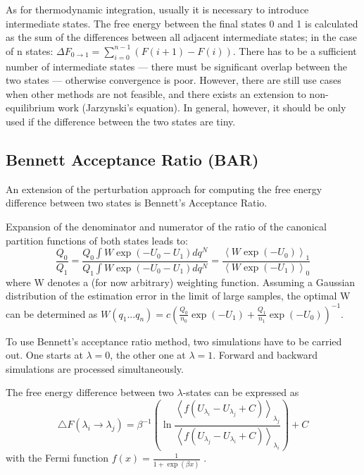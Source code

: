 As for thermodynamic integration, usually it is necessary to
introduce intermediate states. The free energy between the final states
0 and 1 is calculated as the sum of the differences between all adjacent
intermediate states; in the case of n states: $\Delta F_{0\rightarrow1}=\sum_{i=0}^{n-1}\left(F\left(i+1\right)-F\left(i\right)\right)$.
There has to be a sufficient number of intermediate states --- there must be significant overlap between the two states --- otherwise convergence is poor.
However, there are still use cases when other methods are not feasible\cite{Boresch.2017},
and there exists an extension to non-equilibrium work (Jarzynski's
equation)\cite{Boresch.2017}. In general, however, it should be only used
if the difference between the two states are tiny\cite{Shirts.2013}.

\subsection{Bennett Acceptance Ratio (BAR)}

An extension of the perturbation approach for computing the free energy difference between
two states is Bennett's Acceptance Ratio\cite{Bennett.1976}. 

Expansion of the denominator and numerator of the ratio of the canonical
partition functions of both states leads to: 
\[
\frac{Q_{0}}{Q_{1}}=\frac{Q_{0}\int W\exp\left(-U_{0}-U_{1}\right)dq^{N}}{Q_{1}\int W\exp\left(-U_{0}-U_{1}\right)dq^{N}}=\frac{\left\langle W\exp\left(-U_{0}\right)\right\rangle _{1}}{\left\langle W\exp\left(-U_{1}\right)\right\rangle _{0}}
\]
where W denotes a (for now arbitrary) weighting function. Assuming
a Gaussian distribution of the estimation error in the limit of large
samples, the optimal W can be determined as $W\left(q_{1}...q_{n}\right)=c\left(\frac{Q_{0}}{n_{0}}\exp\left(-U_{1}\right)+\frac{Q_{1}}{n_{1}}\exp\left(-U_{0}\right)\right)^{-1}$\cite{Bennett.1976}. 

To use Bennett's acceptance ratio method, two simulations have
to be carried out. One starts at $\lambda=0$, the other one at $\lambda=1$.
Forward and backward simulations are processed simultaneously. 

The free energy difference between two $\lambda$-states can be expressed as
\[
\bigtriangleup F\left(\lambda_{i}\rightarrow\lambda_{j}\right)=\beta^{-1}\left(\ln\frac{\left\langle f\left(U_{\lambda_{i}}-U_{\lambda_{j}}+C\right)\right\rangle _{\lambda_{j}}}{\left\langle f\left(U_{\lambda_{j}}-U_{\lambda_{i}}+C\right)\right\rangle _{\lambda_{i}}}\right)+C
\]
with the Fermi function $f\left(x\right)=\frac{1}{1+\exp\left(\beta x\right)}$
\cite{Bruckner.2011,Gapsys.2015}.

